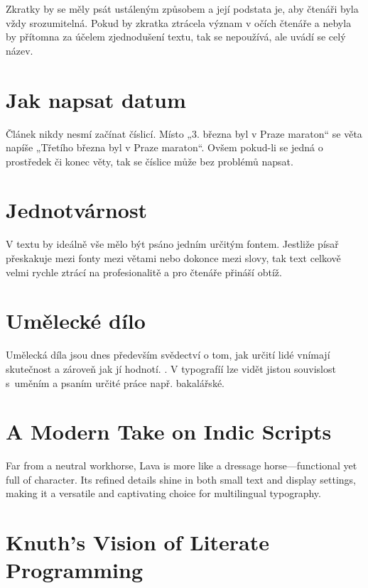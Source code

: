 \documentclass[12pt]{article}
\begin{document}
Zkratky by se měly psát ustáleným způsobem a její podstata je, aby čtenáři byla vždy srozumitelná.  
Pokud by zkratka ztrácela význam v očích čtenáře a nebyla by přítomna za účelem zjednodušení textu, tak
se nepoužívá, ale uvádí se celý název. \cite{pravidla_typografie2004}

\section*{Jak napsat datum}

Článek nikdy nesmí začínat číslicí. Místo „3. března byl v Praze maraton“ se věta napíše  „Třetího března byl v Praze maraton“.
Ovšem pokud-li se jedná o prostředek či konec věty, tak se číslice může bez problémů napsat. \cite{10_pravidel2024}

\section*{Jednotvárnost}

V textu by ideálně vše mělo být psáno jedním určitým fontem. Jestliže písař přeskakuje mezi fonty mezi větami nebo dokonce mezi slovy,
tak text celkově velmi rychle ztrácí na profesionalitě a pro čtenáře přináší obtíž. \cite{zasady_2022}

\section*{Umělecké dílo}

Umělecká díla jsou dnes především svědectví o tom, jak určití lidé vnímají skutečnost a zároveň jak jí hodnotí. \cite{uhk2022}. V 
typografíí lze vidět jistou souvislost s~uměním a psaním určité práce např. bakalářské.

\section*{A Modern Take on Indic Scripts}

Far from a neutral workhorse, Lava is more like a dressage horse—functional yet full of character. 
Its refined details shine in both small text and display settings, 
making it a versatile and captivating choice for multilingual typography. \cite{typographica_lava}

\section*{Knuth's Vision of Literate Programming}
\end{document}
